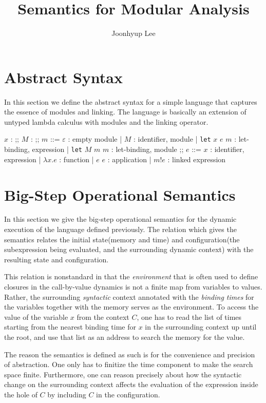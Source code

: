 \documentclass{article}
\title{Semantics for Modular Analysis}
\author{Joonhyup Lee}
\date{}
\newcommand*{\ExprVar}{\mathit{ExprVar}}
\newcommand*{\ModVar}{\mathit{ModVar}}
\newcommand*{\link}[2]{{#1}\mathtt{!}{#2}}
\begin{document}
\maketitle

\section{Abstract Syntax}

In this section we define the abstract syntax for a simple language that captures the essence of modules and linking.
The language is basically an extension of untyped lambda calculus with modules and the linking operator.

\begin{bnfgrammar}
  $x$ : \in \ExprVar
  ;;
  $M$ : \in \ModVar
  ;;
  $m$ ::= $\varepsilon$ : empty module
  | $M$ : identifier, module
  | \texttt{let} $x$ $e$ $m$ : let-binding, expression
  | \texttt{let} $M$ $m$ $m$ : let-binding, module
  ;;
  $e$ ::= $x$ : identifier, expression
  | $\lambda x.e$ : function
  | $e$ $e$ : application
  | $\link{m}{e}$ : linked expression
\end{bnfgrammar}

\section{Big-Step Operational Semantics}

In this section we give the big-step operational semantics for the dynamic execution of the language defined previously.
The relation which gives the semantics relates the initial state(memory and time) and configuration(the subexpression being evaluated, and the surrounding dynamic context) with the resulting state and configuration.

This relation is nonstandard in that the \textit{environment} that is often used to define closures in the call-by-value dynamics is not a finite map from variables to values.
Rather, the surrounding \textit{syntactic} context annotated with the \textit{binding times} for the variables together with the memory serves as the environment.
To access the value of the variable $x$ from the context $C$, one has to read the list of times starting from the nearest binding time for $x$ in the surrounding context up until the root, and use that list as an address to search the memory for the value.

The reason the semantics is defined as such is for the convenience and precision of abstraction.
One only has to finitize the time component to make the search space finite.
Furthermore, one can reason precisely about how the syntactic change on the surrounding context affects the evaluation of the expression inside the hole of $C$ by including $C$ in the configuration.
\end{document}
